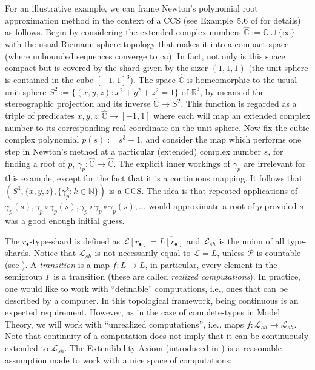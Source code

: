 \documentclass[psamsfonts]{amsart}
\theoremstyle{definition}
\theoremstyle{remark}
\numberwithin{equation}{section}
\begin{document}
For an illustrative example, we can frame Newton's polynomial root approximation method in the context of a CCS (see Example~5.6 of \cite{alva2024approximability} for details) as follows. Begin by considering the extended complex numbers $\hat{\mathbb{C}}:=\mathbb{C}\cup\{\infty\}$ with the usual Riemann sphere topology that makes it into a compact space (where unbounded sequences converge to $\infty$). In fact, not only is this space compact but is covered by the shard given by the sizer $(1,1,1)$ (the unit sphere is contained in the cube $[-1,1]^3$). The space $\hat{\mathbb{C}}$ is homeomorphic to the usual unit sphere $S^2:=\{(x,y,z):x^2+y^2+z^2=1\}$ of $\mathbb R^3$, by means of the stereographic projection and its inverse $\hat{\mathbb{C}}\to S^2$. This function is regarded as a triple of predicates $x,y,z:\hat{\mathbb{C}}\to[-1,1]$ where each will map an extended complex number to its corresponding real coordinate on the unit sphere. Now fix the cubic complex polynomial $p(s):=s^3-1$, and consider the map which performs one step in Newton's method at a particular (extended) complex number $s$, for finding a root of $p$, $\gamma_p:\hat{\mathbb{C}}\to\hat{\mathbb{C}}$. The explicit inner workings of $\gamma_p$ are irrelevant for this example, except for the fact that it is a continuous mapping. It follows that $(S^3,\{x,y,z\},\{\gamma_p^k:k\in\mathbb N\})$ is a CCS. The idea is that repeated applications of $\gamma_p(s), \gamma_p\circ\gamma_p(s), \gamma_p\circ\gamma_p\circ\gamma_p(s),\dots$ would approximate a root of $p$ provided $s$ was a good enough initial guess.

The $r_{\bullet}$-type-shard is defined as $\mathcal{L}[r_\bullet]=\overline{L[r_\bullet]}$ and $\mathcal{L}_{sh}$ is the union of all type-shards. Notice that $\mathcal{L}_{sh}$ is not necessarily equal to $\mathcal{L}=\overline{L}$, unless $\mathcal{P}$ is countable (see \cite{alva2024approximability}). A \emph{transition} is a map $f:L\rightarrow L$, in particular, every element in the semigroup $\Gamma$ is a transition (these are called \emph{realized computations}). In practice, one would like to work with ``definable'' computations, i.e., ones that can be described by a computer. In this topological framework, being continuous is an expected requirement. However, as in the case of complete-types in Model Theory, we will work with ``unrealized computations'', i.e., maps $f:\mathcal{L}_{sh}\rightarrow\mathcal{L}_{sh}$. Note that continuity of a computation does not imply that it can be continuously extended to $\mathcal{L}_{sh}$. The Extendibility Axiom (introduced in \cite{alva2024approximability}) is a reasonable assumption made to work with a nice space of computations:
\end{document}
